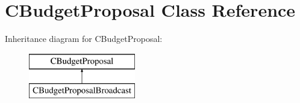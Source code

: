 \hypertarget{class_c_budget_proposal}{}\section{C\+Budget\+Proposal Class Reference}
\label{class_c_budget_proposal}
Inheritance diagram for C\+Budget\+Proposal\+:\begin{figure}[H]
\begin{center}
\leavevmode
\includegraphics[height=2.000000cm]{class_c_budget_proposal}
\end{center}
\end{figure}
